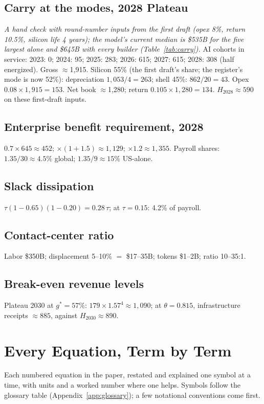 \documentclass[11pt,letterpaper]{article}
\begin{document}
\subsection{Carry at the modes, 2028 Plateau}
\emph{A hand check with round-number inputs from the first draft (opex 8\%, return 10.5\%, silicon life 4 years); the model's current median is \$535B for the five largest alone and \$645B with every builder (Table~\ref{tab:carry}).} AI cohorts in service: 2023: 0; 2024: 95; 2025: 283; 2026: 615; 2027: 615; 2028: 308 (half energized). Gross $\approx$1{,}915. Silicon 55\% (the first draft's share; the register's mode is now 52\%): depreciation $1{,}053/4=263$; shell 45\%: $862/20=43$. Opex $0.08\times1{,}915=153$. Net book $\approx$1{,}280; return $0.105\times1{,}280=134$. $H_{2028}\approx590$ on these first-draft inputs.
\subsection{Enterprise benefit requirement, 2028}
$0.7\times645\approx452$; $\times(1+1.5)\approx1{,}129$; $\times1.2\approx1{,}355$. Payroll shares: $1.35/30\approx4.5\%$ global; $1.35/9\approx15\%$ US-alone.
\subsection{Slack dissipation}
$\tau(1-0.65)(1-0.20)=0.28\,\tau$; at $\tau=0.15$: 4.2\% of payroll.
\subsection{Contact-center ratio}
Labor \$350B; displacement 5--10\% $=$ \$17--35B; tokens \$1--2B; ratio 10--35:1.
\subsection{Break-even revenue levels}
Plateau 2030 at $g^{*}=57\%$: $179\times1.57^{4}\approx1{,}090$; at $\theta=0.815$, infrastructure receipts $\approx885$, against $H_{2030}\approx890$.

\newpage
\section{Every Equation, Term by Term}\label{app:equations}
Each numbered equation in the paper, restated and explained one symbol at a time, with units and a worked number where one helps. Symbols follow the glossary table (Appendix~\ref{app:glossary}); a few notational conventions come first.
\end{document}
